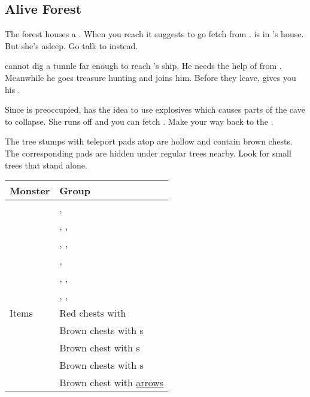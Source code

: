 \subsection{Alive Forest}
\label{map:alive_forest}

The forest houses a . When you reach it  suggests to go fetch  from .  is in 's house. But she's asleep. Go talk to  instead.

 cannot dig a tunnle far enough to reach 's ship. He needs the help of  from . Meanwhile he goes treasure hunting and  joins him. Before they leave,  gives you his .

Since  is preoccupied,  has the idea to use explosives which causes parts of the cave to collapse. She runs off and you can fetch . Make your way back to the .

\bigskip

The tree stumps with teleport pads atop are hollow and contain brown chests. The corresponding pads are hidden under regular trees nearby. Look for small trees that stand alone.


\noindent\begin{tabularx}{\textwidth}[l]{lX}
	Monster & Group
\\ \hline
	\nameref{monster:mummy}
	& \nameref{monster:mummy}, \nameref{monster:mummy} \\
	& \nameref{monster:mummy}, \nameref{monster:mummy}, \nameref{monster:spector} \\
	& \nameref{monster:mummy}, \nameref{monster:mummy}, \nameref{monster:mummy}
\\ \hline
	\nameref{monster:spector}
	& \nameref{monster:spector}, \nameref{monster:spector} \\
	& \nameref{monster:spector}, \nameref{monster:spector}, \nameref{monster:mummy} \\
	& \nameref{monster:spector}, \nameref{monster:spector}, \nameref{monster:spector}
\\ \hline
	Items
	& Red chests with \nameref{weapon:giants_axe} \\
	& Brown chests with \nameref{item:cure_potion}s \\
	& Brown chest with \nameref{item:heal_potion}s \\
	& Brown chests with \nameref{item:refresher}s \\
	& Brown chest with \hyperref[weapon:bow_of_grace]{arrows}
\end{tabularx}
